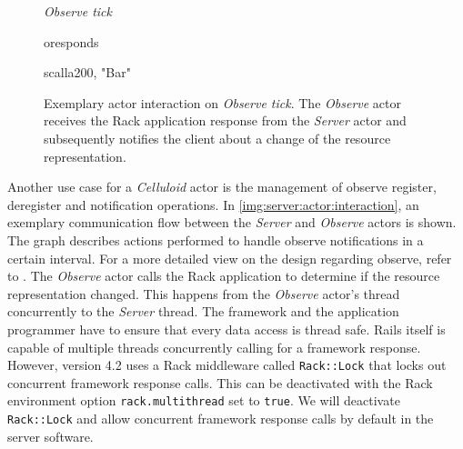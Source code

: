 		\begin{figure}
			\begin{center}
					\begin{sequencediagram}

						\begin{sdblock}{\emph{Observe tick}}{}
							\begin{call}{o}{respond}{s}{}
								\begin{call}{s}{call}{a}{200, "Bar"}
								\end{call}
							\end{call}

						\end{sdblock}
					\end{sequencediagram}
			\end{center}
			\caption[Exemplary actor interaction on \emph{Observe
				tick}]{Exemplary actor interaction on \emph{Observe tick}. The
				\emph{Observe} actor receives the Rack application response
				from the \emph{Server} actor and subsequently notifies the
				client about a change of the resource representation.}
			\label{img:server:actor:interaction}
		\end{figure}

		Another use case for a \emph{Celluloid} actor is the management of
		observe \cite{observe} register, deregister and notification
		operations. In \autoref{img:server:actor:interaction}, an exemplary
		communication flow between the \emph{Server} and \emph{Observe} actors
		is shown. The graph describes actions performed to handle observe
		notifications in a certain interval. For a more detailed view on the
		design regarding observe, refer to
		. The \emph{Observe} actor calls
		the Rack application to determine if the resource representation
		changed. This happens from the \emph{Observe} actor's thread
		concurrently to the \emph{Server} thread. The framework and the
		application programmer have to ensure that every data access is thread
		safe. \ac{Rails} itself is capable of multiple threads concurrently
		calling for a framework response. However, version 4.2 uses a Rack
		middleware called \texttt{Rack::Lock} that locks out concurrent
		framework response calls. This can be deactivated with the Rack
		environment option \texttt{rack.multithread} set to \texttt{true}. We
		will deactivate \texttt{Rack::Lock} and allow concurrent framework
		response calls by default in the server software.
		
